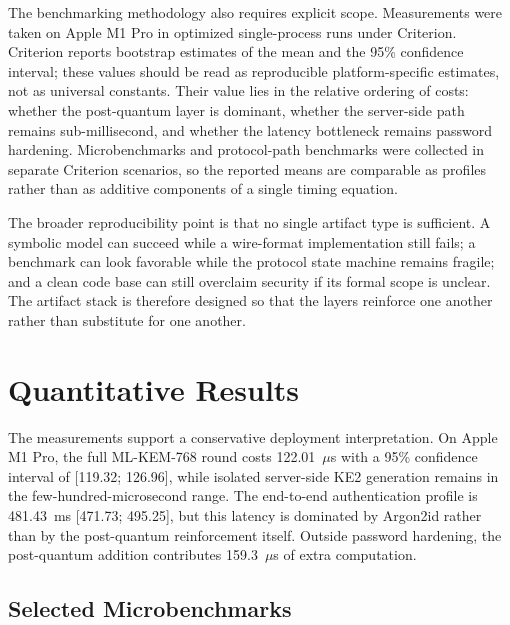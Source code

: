 \documentclass[conference]{IEEEtran}
\begin{document}
The benchmarking methodology also requires explicit scope. Measurements were taken on Apple M1 Pro in optimized single-process runs under Criterion. Criterion reports bootstrap estimates of the mean and the 95\% confidence interval; these values should be read as reproducible platform-specific estimates, not as universal constants. Their value lies in the relative ordering of costs: whether the post-quantum layer is dominant, whether the server-side path remains sub-millisecond, and whether the latency bottleneck remains password hardening. Microbenchmarks and protocol-path benchmarks were collected in separate Criterion scenarios, so the reported means are comparable as profiles rather than as additive components of a single timing equation.

The broader reproducibility point is that no single artifact type is sufficient. A symbolic model can succeed while a wire-format implementation still fails; a benchmark can look favorable while the protocol state machine remains fragile; and a clean code base can still overclaim security if its formal scope is unclear. The artifact stack is therefore designed so that the layers reinforce one another rather than substitute for one another.

\section{Quantitative Results}

The measurements support a conservative deployment interpretation. On Apple M1 Pro, the full ML-KEM-768 round costs 122.01~$\mu$s with a 95\% confidence interval of [119.32; 126.96], while isolated server-side KE2 generation remains in the few-hundred-microsecond range. The end-to-end authentication profile is 481.43~ms [471.73; 495.25], but this latency is dominated by Argon2id \cite{argon2rfc2021} rather than by the post-quantum reinforcement itself. Outside password hardening, the post-quantum addition contributes 159.3~$\mu$s of extra computation.

\subsection{Selected Microbenchmarks}
\end{document}
